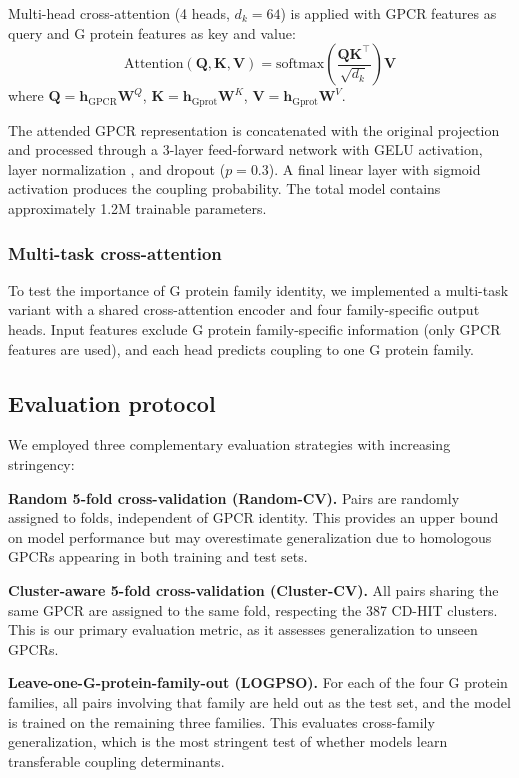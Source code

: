 \documentclass[11pt,a4paper]{article}
\begin{document}
Multi-head cross-attention (4 heads, $d_k = 64$) is applied with GPCR features as query and G protein features as key and value:
\begin{equation}
\text{Attention}(\mathbf{Q}, \mathbf{K}, \mathbf{V}) = \text{softmax}\left(\frac{\mathbf{Q}\mathbf{K}^\top}{\sqrt{d_k}}\right)\mathbf{V}
\end{equation}
where $\mathbf{Q} = \mathbf{h}_{\text{GPCR}}\mathbf{W}^Q$, $\mathbf{K} = \mathbf{h}_{\text{Gprot}}\mathbf{W}^K$, $\mathbf{V} = \mathbf{h}_{\text{Gprot}}\mathbf{W}^V$.

The attended GPCR representation is concatenated with the original projection and processed through a 3-layer feed-forward network with GELU activation, layer normalization \cite{ba2016layer}, and dropout ($p=0.3$). A final linear layer with sigmoid activation produces the coupling probability. The total model contains approximately 1.2M trainable parameters.

\subsubsection{Multi-task cross-attention}

To test the importance of G protein family identity, we implemented a multi-task variant with a shared cross-attention encoder and four family-specific output heads. Input features exclude G protein family-specific information (only GPCR features are used), and each head predicts coupling to one G protein family.

\subsection{Evaluation protocol}

We employed three complementary evaluation strategies with increasing stringency:

\textbf{Random 5-fold cross-validation (Random-CV).} Pairs are randomly assigned to folds, independent of GPCR identity. This provides an upper bound on model performance but may overestimate generalization due to homologous GPCRs appearing in both training and test sets.

\textbf{Cluster-aware 5-fold cross-validation (Cluster-CV).} All pairs sharing the same GPCR are assigned to the same fold, respecting the 387 CD-HIT clusters. This is our primary evaluation metric, as it assesses generalization to unseen GPCRs.

\textbf{Leave-one-G-protein-family-out (LOGPSO).} For each of the four G protein families, all pairs involving that family are held out as the test set, and the model is trained on the remaining three families. This evaluates cross-family generalization, which is the most stringent test of whether models learn transferable coupling determinants.
\end{document}
